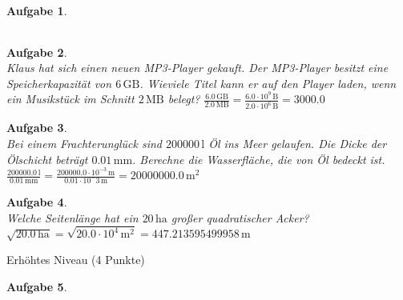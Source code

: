 \documentclass[12pt,fleqn]{article}
\theoremstyle{aufg}
\newtheorem{aufgabe}{Aufgabe}
\theoremstyle{bsp}
\begin{document}
\begin{flushleft}
\begin{aufgabe}
\begin{tabular}{c|c|c|c|c|c|c}
\end{tabular} 

\end{aufgabe} 
\begin{aufgabe} ~ \\ 
Klaus hat sich einen neuen MP3-Player gekauft. Der MP3-Player besitzt eine Speicherkapazit\"at von $6\mathrm{\,GB}$. Wieviele Titel kann er auf den Player laden, wenn ein Musikst\"uck im Schnitt $2\mathrm{\,MB}$ belegt? 
$\frac{6.0\mathrm{\,GB}}{2.0\mathrm{\,MB}} = \frac{6.0\cdot 10^9\mathrm{\,B}}{2.0\cdot 10^6\mathrm{\,B}}=3000.0\mathrm{\,}$\end{aufgabe} 
\begin{aufgabe} ~ \\ 
Bei einem Frachterungl\"uck sind $200000\mathrm{\,l}$ \"Ol ins Meer gelaufen. Die Dicke der \"Olschicht betr\"agt $0.01\mathrm{\,mm}$. Berechne die Wasserfl\"ache, die von \"Ol bedeckt ist.
$\frac{200000.0\mathrm{\,l}}{0.01\mathrm{\,mm}} = \frac{200000.0\cdot 10^{-3}\mathrm{\,m}}{0.01\cdot 10^-3\mathrm{\,m}}=20000000.0\mathrm{\,m}^2$\end{aufgabe} 
\begin{aufgabe} ~ \\ 
Welche Seitenl\"ange hat ein $20\mathrm{\,ha}$ gro\ss{}er quadratischer Acker?
$\sqrt{20.0\mathrm{\,ha}}=\sqrt{20.0\cdot 10^4\mathrm{\,m}^2}=447.213595499958\mathrm{\,m}$\end{aufgabe} 
\begin{center} \begin{framed} Erh\"ohtes Niveau (4 Punkte) \end{framed} \end{center}\begin{aufgabe} ~ \\ 

\end{aufgabe}
\end{flushleft}
\end{document}
